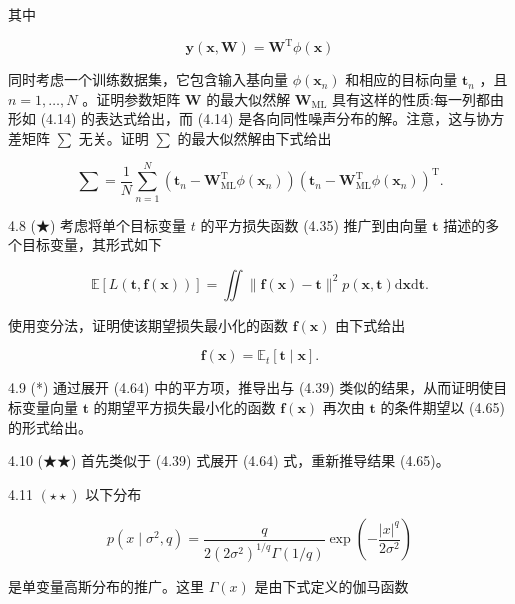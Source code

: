 \documentclass[10pt]{report}
\begin{document}
其中

\[
\mathbf{y}\left( {\mathbf{x},\mathbf{W}}\right)  = {\mathbf{W}}^{\mathrm{T}}\phi \left( \mathbf{x}\right)  \tag{4.62}
\]

同时考虑一个训练数据集，它包含输入基向量 \(\phi \left( {\mathbf{x}}_{n}\right)\) 和相应的目标向量 \({\mathbf{t}}_{n}\) ，且 \(n = 1,\ldots ,N\) 。证明参数矩阵 \(\mathbf{W}\) 的最大似然解 \({\mathbf{W}}_{\mathrm{{ML}}}\) 具有这样的性质:每一列都由形如 (4.14) 的表达式给出，而 (4.14) 是各向同性噪声分布的解。注意，这与协方差矩阵 \(\mathbf{\sum }\) 无关。证明 \(\mathbf{\sum }\) 的最大似然解由下式给出

\[
\mathbf{\sum } = \frac{1}{N}\mathop{\sum }\limits_{{n = 1}}^{N}\left( {{\mathbf{t}}_{n} - {\mathbf{W}}_{\mathrm{{ML}}}^{\mathrm{T}}\phi \left( {\mathbf{x}}_{n}\right) }\right) {\left( {\mathbf{t}}_{n} - {\mathbf{W}}_{\mathrm{{ML}}}^{\mathrm{T}}\phi \left( {\mathbf{x}}_{n}\right) \right) }^{\mathrm{T}}. \tag{4.63}
\]

4.8 (★) 考虑将单个目标变量 \(t\) 的平方损失函数 (4.35) 推广到由向量 \(\mathbf{t}\) 描述的多个目标变量，其形式如下

\[
\mathbb{E}\left\lbrack  {L\left( {\mathbf{t},\mathbf{f}\left( \mathbf{x}\right) }\right) }\right\rbrack   = \iint \parallel \mathbf{f}\left( \mathbf{x}\right)  - \mathbf{t}{\parallel }^{2}p\left( {\mathbf{x},\mathbf{t}}\right) \mathrm{d}\mathbf{x}\mathrm{d}\mathbf{t}. \tag{4.64}
\]

使用变分法，证明使该期望损失最小化的函数 \(\mathbf{f}\left( \mathbf{x}\right)\) 由下式给出

\[
\mathbf{f}\left( \mathbf{x}\right)  = {\mathbb{E}}_{t}\left\lbrack  {\mathbf{t} \mid  \mathbf{x}}\right\rbrack  . \tag{4.65}
\]

4.9 (*) 通过展开 (4.64) 中的平方项，推导出与 (4.39) 类似的结果，从而证明使目标变量向量 \(\mathbf{t}\) 的期望平方损失最小化的函数 \(\mathbf{f}\left( \mathbf{x}\right)\) 再次由 \(\mathbf{t}\) 的条件期望以 (4.65) 的形式给出。

4.10 (★★) 首先类似于 (4.39) 式展开 (4.64) 式，重新推导结果 (4.65)。

4.11 \(\left( {\star  \star  }\right)\) 以下分布

\[
p\left( {x \mid  {\sigma }^{2},q}\right)  = \frac{q}{2{\left( 2{\sigma }^{2}\right) }^{1/q}\Gamma \left( {1/q}\right) }\exp \left( {-\frac{{\left| x\right| }^{q}}{2{\sigma }^{2}}}\right)  \tag{4.66}
\]

是单变量高斯分布的推广。这里 \(\Gamma \left( x\right)\) 是由下式定义的伽马函数
\end{document}
